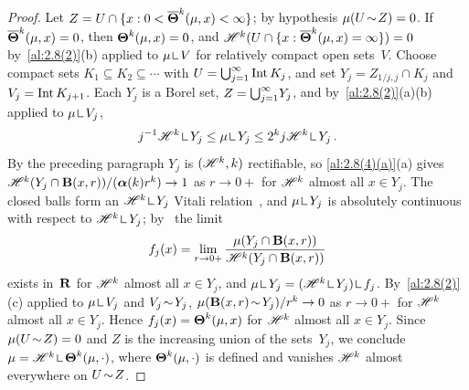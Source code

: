 \begin{proof}
    Let $Z = U \cap \{ x : 0 < \boldsymbol{\overline{\Theta}}^{k}(\mu,x) < \infty \}$; by hypothesis $\mu(U
    \!\sim\! Z) = 0$. If $\boldsymbol{\overline{\Theta}}^{k}(\mu,x) = 0$, then $\boldsymbol{\Theta}^{k}(\mu,x) = 0$, and
    $\mathscr{H}^{k}(U \cap \{ x : \boldsymbol{\overline{\Theta}}^{k}(\mu,x) = \infty \}) = 0$ by~\ref{al:2.8(2)}(b)
    applied to $\mu \restrict V$ for relatively compact open sets~$V$. Choose compact sets $K_1
    \subseteq K_2 \subseteq \cdots$ with $U = {{\textstyle \bigcup}}_{j=1}^\infty \operatorname{Int} K_j$, and set $Y_j = Z_{1/j,j}
    \cap K_j$ and $V_j = \operatorname{Int} K_{j+1}$. Each $Y_j$ is a Borel set, $Z = {{\textstyle \bigcup}}_{j=1}^\infty Y_j$,
    and by~\ref{al:2.8(2)}(a)(b) applied to $\mu \restrict V_j$,
    \begin{displaymath}
        j^{-1} \HM^{\vdim} \restrict Y_j \le \mu \restrict Y_j \le 2^{\vdim} j \HM^{\vdim} \restrict
        Y_j \,.
    \end{displaymath}
    By the preceding paragraph $Y_j$ is $(\mathscr{H}^{k},k)$ rectifiable, so
    \ref{al:2.8(4)(a)}(a) gives $\mathscr{H}^{k}(Y_j \cap \mathbf{B}(x,r)) / (\boldsymbol{\alpha}(k)
    r^{k}) \to 1$ as $r \to 0+$ for $\mathscr{H}^{k}$ almost all $x \in Y_j$. The closed balls
    form an $\HM^{\vdim} \restrict Y_j$ Vitali relation~\cite[2.8.18]{Federer1969}, and $\mu
    \restrict Y_j$ is absolutely continuous with respect to $\HM^{\vdim} \restrict Y_j$;
    by~\cite[2.9.2, 2.9.5, 2.9.7]{Federer1969} the limit
    \begin{displaymath}
        f_j(x) = \lim_{r \to 0+} \frac{\mu(Y_j \cap \mathbf{B}(x,r))}{\mathscr{H}^{k}(Y_j \cap
        \mathbf{B}(x,r))}
    \end{displaymath}
    exists in~$\mathbf{R}$ for $\mathscr{H}^{k}$ almost all $x \in Y_j$, and $\mu \restrict Y_j =
    (\HM^{\vdim} \restrict Y_j) \restrict f_j$. By~\ref{al:2.8(2)}(c) applied to $\mu \restrict
    V_j$ and $V_j \!\sim\! Y_j$, $\mu(\mathbf{B}(x,r) \!\sim\! Y_j) / r^{k} \to 0$ as $r \to 0+$
    for $\mathscr{H}^{k}$ almost all $x \in Y_j$. Hence $f_j(x) = \boldsymbol{\Theta}^{k}(\mu,x)$ for
    $\mathscr{H}^{k}$ almost all $x \in Y_j$. Since $\mu(U \!\sim\! Z) = 0$ and $Z$ is the increasing
    union of the sets~$Y_j$, we conclude $\mu = \HM^{\vdim} \restrict \density^{\vdim}(\mu,\cdot)$,
    where $\boldsymbol{\Theta}^{k}(\mu,\cdot)$ is defined and vanishes $\mathscr{H}^{k}$ almost everywhere on
    $U \!\sim\! Z$.
\end{proof}

